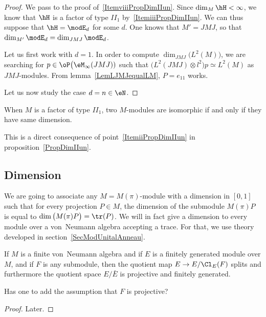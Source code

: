 \begin{proof}
	We pass to the proof of~\ref{ItemviiiPropDimIIun}. Since $\dim_M\hH<\infty$, we know that $\hH$ is a factor of type $II_1$ by~\ref{ItemiiiPropDimIIun}. We can thus suppose that $\hH=\modE_d$ for some $d$. One knows that $M'=JMJ$, so that $\dim_{M'}\modE_d=\dim_{JMJ}\modE_d$.

	Let us first work with $d=1$. In order to compute $\dim_{JMJ}\big( L^2(M) \big)$, we are searching for $p\in\oP\big(\eM_{\infty}(JMJ))$ such that $\big( L^2(JMJ)\otimes l^2 \big)p\simeq L^2(M)$ as $JMJ$-modules. From lemma~\ref{LemLJMJequalLM}, $P=e_{11}$ works.

	Let us now study the case $d=n\in\eN$.

\end{proof}

\begin{corollary}
	When $M$ is a factor of type $II_1$, two $M$-modules are isomorphic if and only if they have same dimension.
\end{corollary}
This is a direct consequence of point~\ref{ItemiiPropDimIIun} in proposition~\ref{PropDimIIun}.


\subsection{Dimension}

We are going to associate any $M=M(\pi)$-module with a dimension in $[0,1]$ such that for every projection $P\in M$, the dimension of the submodule $M(\pi)P$ is equal to $\dim\big( M(\pi)P \big)=\tr(P)$. We will in fact give a dimension to every module over a von~Neumann algebra accepting a trace. For that, we use theory developed in section~\ref{SecModUnitalAnneau}.

\begin{theorem}			\label{ThofgsurMFSubEEClSplits}
	If $M$ is a finite von~Neumann algebra and if $E$ is a finitely generated module over $M$, and if $F$ is any submodule, then the quotient map $E\to E/\Cl_E(F)$ splits and furthermore the quotient space $E/\bar E$ is projective and finitely generated.
\end{theorem}

\begin{probleme}
	Has one to add the assumption that $F$ is projective?
\end{probleme}
\begin{proof}
	Later.
\end{proof}

